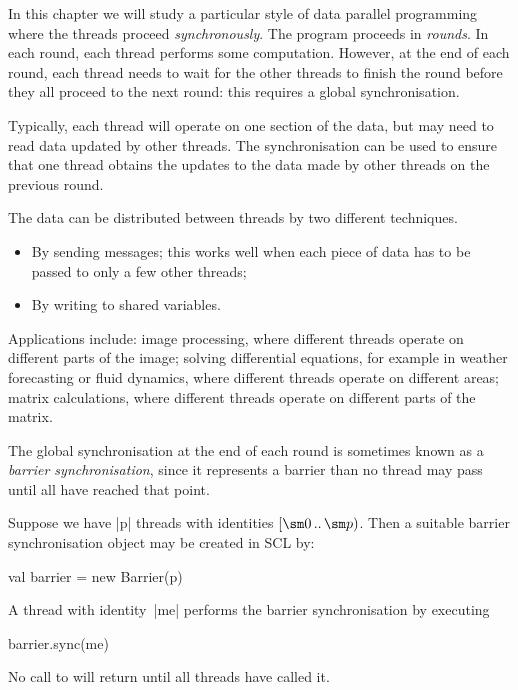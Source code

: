 In this chapter we will study a particular style of data parallel programming
where the threads proceed \emph{synchronously}.  The program proceeds in
\emph{rounds}.  In each round, each thread performs some computation.
However, at the end of each round, each thread needs to wait for the other
threads to finish the round before they all proceed to the next round: this
requires a global synchronisation.


Typically, each thread will operate on one section of the data, but  may
need to read data updated by other threads.  The synchronisation can be used
to ensure that one thread obtains the updates to the data made by other
threads on the previous round.

The data can be distributed between threads by two different techniques.
%
\begin{itemize}
\item
By sending messages; this works well when each piece of data has to be
passed to only a few other threads;

\item
By writing to shared variables.
\end{itemize}



Applications include: image processing, where different threads operate on
different parts of the image; solving differential equations, for example in
weather forecasting or fluid dynamics, where different threads operate on
different areas; matrix calculations, where different threads operate on
different parts of the matrix.



The global synchronisation at the end of each round is sometimes known as a
\emph{barrier synchronisation}, since it represents a barrier than no thread
may pass until all have reached that point.

Suppose we have |p| threads with identities $\interval{\sm 0}{\sm p}$.  Then a
suitable barrier synchronisation object may be created in SCL by:
%
\begin{scala}
  val barrier = new Barrier(p)
\end{scala}
%
A thread with identity~|me| performs the barrier synchronisation by executing%
%
\begin{scala}
  barrier.sync(me)
\end{scala}
%
No call to  will return until all  threads have called
it. 

